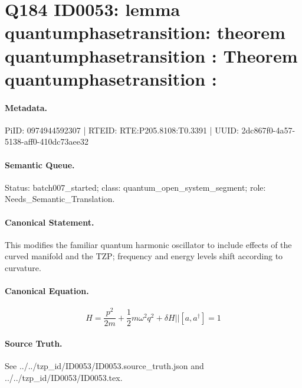 \section*{Q184 ID0053: lemma quantumphasetransition: theorem quantumphasetransition : Theorem quantumphasetransition :}
\paragraph{Metadata.}
PiID: 0974944592307 | RTEID: RTE:P205.8108:T0.3391 | UUID: 2dc867f0-4a57-5138-aff0-410dc73aee32

\paragraph{Semantic Queue.}
Status: batch007\_started; class: quantum\_open\_system\_segment; role: Needs\_Semantic\_Translation.

\paragraph{Canonical Statement.}
This modifies the familiar quantum harmonic oscillator to include effects of the curved manifold and the TZP; frequency and energy levels shift according to curvature.

\paragraph{Canonical Equation.}
\[
H = \frac{p^{2}}{2m} + \frac{1}{2}m\omega^{2}q^{2} + \delta H || \left[a,a^{\dagger}\right] = 1
\]

\paragraph{Source Truth.}
See ../../tzp\_id/ID0053/ID0053.source\_truth.json and ../../tzp\_id/ID0053/ID0053.tex.
